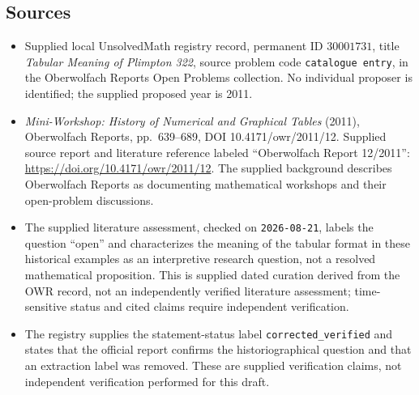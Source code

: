 \documentclass[11pt]{article}
\begin{document}
\subsection{Sources}
\begin{itemize}
\item Supplied local UnsolvedMath registry record, permanent ID \(30001731\), title \emph{Tabular Meaning of Plimpton 322}, source problem code \texttt{catalogue entry}, in the Oberwolfach Reports Open Problems collection. No individual proposer is identified; the supplied proposed year is 2011.
\item \emph{Mini-Workshop: History of Numerical and Graphical Tables} (2011), Oberwolfach Reports, pp.\ 639--689, DOI 10.4171/owr/2011/12. Supplied source report and literature reference labeled ``Oberwolfach Report 12/2011'': \url{https://doi.org/10.4171/owr/2011/12}. The supplied background describes Oberwolfach Reports as documenting mathematical workshops and their open-problem discussions.
\item The supplied literature assessment, checked on \texttt{2026-08-21}, labels the question ``open'' and characterizes the meaning of the tabular format in these historical examples as an interpretive research question, not a resolved mathematical proposition. This is supplied dated curation derived from the OWR record, not an independently verified literature assessment; time-sensitive status and cited claims require independent verification.
\item The registry supplies the statement-status label \texttt{corrected\_verified} and states that the official report confirms the historiographical question and that an extraction label was removed. These are supplied verification claims, not independent verification performed for this draft.
\end{itemize}
\end{document}
